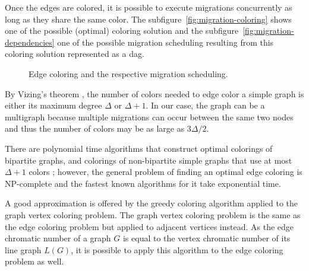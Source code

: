Once the edges are colored, it is possible to execute migrations concurrently as long as they share the same color. The subfigure~\ref{fig:migration-coloring} shows one of the possible (optimal) coloring solution and the subfigure~\ref{fig:migration-dependencies} one of the possible migration scheduling resulting from this coloring solution represented as a \gls{dag}.


\begin{figure}[h]
	\hfill
	\caption{Edge coloring and the respective migration scheduling.}
	\label{fig:migration-process-2}
\end{figure}

By Vizing's theorem \cite{vizing}, the number of colors needed to edge color a simple graph is either its maximum degree $\Delta$ or $\Delta+1$. In our case, the graph can be a multigraph because multiple migrations can occur between the same two nodes and thus the number of colors may be as large as $3\Delta/2$.

There are polynomial time algorithms that construct optimal colorings of bipartite graphs, and colorings of non-bipartite simple graphs that use at most $\Delta+1$ colors \cite{bipartite}; however, the general problem of finding an optimal edge coloring is NP-complete and the fastest known algorithms for it take exponential time.

A good approximation is offered by the greedy coloring algorithm applied to the graph vertex coloring problem. The graph vertex coloring problem is the same as the edge coloring problem but applied to adjacent vertices instead. As the edge chromatic number of a graph $G$ is equal to the vertex chromatic number of its line graph $L(G)$, it is possible to apply this algorithm to the edge coloring problem as well.

